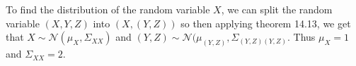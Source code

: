 
To find the distribution of the random variable $ X$, we can split the random variable $ (X,Y,Z)$
into $ (X, (Y,Z))$ so then applying theorem 14.13, we get that $ X \sim \mathcal N(\mu_{X} ,
\Sigma_{XX} )$ and
$ (Y,Z) \sim \mathcal N(\mu_{(Y,Z)}, \Sigma_{(Y,Z)(Y,Z)} $. Thus $ \mu_{X} = 1$ and $ \Sigma_{XX} =
2$.

    

